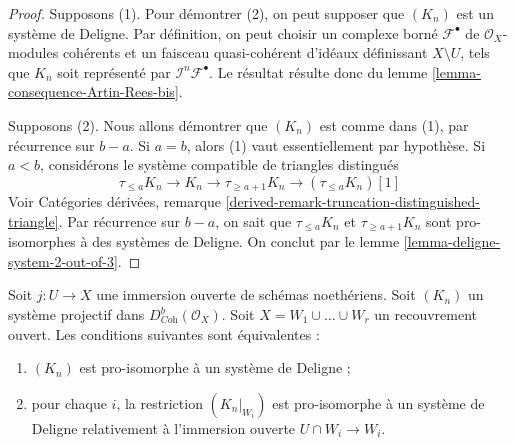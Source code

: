 \begin{proof}
Supposons (1). Pour démontrer (2), on peut supposer que $(K_n)$ est un système de Deligne. Par définition, on peut choisir un complexe borné $\mathcal{F}^\bullet$ de $\mathcal{O}_X$-modules cohérents et un faisceau quasi-cohérent d'idéaux définissant $X \setminus U$, tels que $K_n$ soit représenté par $\mathcal{I}^n\mathcal{F}^\bullet$. Le résultat résulte donc du lemme \ref{lemma-consequence-Artin-Rees-bis}.

\medskip\noindent
Supposons (2). Nous allons démontrer que $(K_n)$ est comme dans (1), par récurrence sur $b - a$. Si $a = b$, alors (1) vaut essentiellement par hypothèse. Si $a < b$, considérons le système compatible de triangles distingués
$$
\tau_{\leq a}K_n \to K_n \to \tau_{\geq a + 1}K_n \to (\tau_{\leq a}K_n)[1]
$$
Voir Catégories dérivées, remarque \ref{derived-remark-truncation-distinguished-triangle}. Par récurrence sur $b - a$, on sait que $\tau_{\leq a}K_n$ et $\tau_{\geq a + 1}K_n$ sont pro-isomorphes à des systèmes de Deligne. On conclut par le lemme \ref{lemma-deligne-system-2-out-of-3}.
\end{proof}

\begin{lemma}
\label{lemma-characterize-extension-by-zero}
Soit $j : U \to X$ une immersion ouverte de schémas noethériens. Soit $(K_n)$ un système projectif dans $D^b_{\textit{Coh}}(\mathcal{O}_X)$. Soit $X = W_1 \cup \ldots \cup W_r$ un recouvrement ouvert. Les conditions suivantes sont équivalentes :
\begin{enumerate}
\item $(K_n)$ est pro-isomorphe à un système de Deligne ;
\item pour chaque $i$, la restriction $(K_n|_{W_i})$ est pro-isomorphe à un système de Deligne relativement à l'immersion ouverte $U \cap W_i \to W_i$.
\end{enumerate}
\end{lemma}

